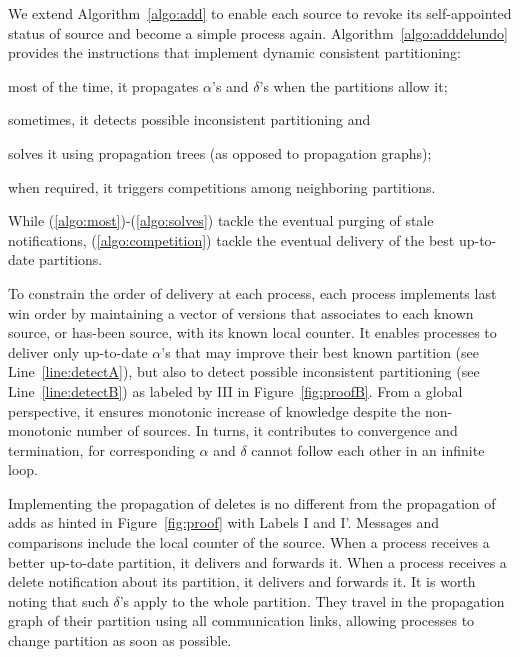We extend Algorithm~\ref{algo:add} to enable each source to revoke its
self-appointed status of source and become a simple process again.
Algorithm~\ref{algo:adddelundo} provides the instructions that
implement dynamic consistent partitioning:
\begin{inparaenum}[(i)]
\item \label{algo:most} most of the time, it propagates $\alpha$'s and
  $\delta$'s when the partitions allow it;
\item \label{algo:sometimes} sometimes, it detects possible
  inconsistent partitioning and
\item \label{algo:solves}solves it using propagation trees (as opposed
  to propagation graphs);
\item \label{algo:competition} when required, it triggers competitions
  among neighboring partitions.
\end{inparaenum}
While (\ref{algo:most})-(\ref{algo:solves}) tackle the eventual purging of
stale notifications, (\ref{algo:competition}) tackle the eventual
delivery of the best up-to-date partitions.

To constrain the order of delivery at each process, each process
implements last win order by maintaining a vector of versions that
associates to each known source, or has-been source, with its known
local counter. It enables processes to deliver only up-to-date
$\alpha$'s that may improve their best known partition (see
Line~\ref{line:detectA}), but also to detect possible inconsistent
partitioning (see Line~\ref{line:detectB}) as labeled by III in
Figure~\ref{fig:proofB}. From a global perspective, it ensures
monotonic increase of knowledge despite the non-monotonic number of
sources. In turns, it contributes to convergence and termination, for
corresponding $\alpha$ and $\delta$ cannot follow each other in an
infinite loop.

Implementing the propagation of deletes is no different from the
propagation of adds as hinted in Figure~\ref{fig:proof} with Labels I
and I'. Messages and comparisons include the local counter of the
source. When a process receives a better up-to-date partition, it
delivers and forwards it. When a process receives a delete
notification about its partition, it delivers and forwards it. It is
worth noting that such $\delta$'s apply to the whole partition. They
travel in the propagation graph of their partition using all
communication links, allowing processes to change partition as soon as
possible.

